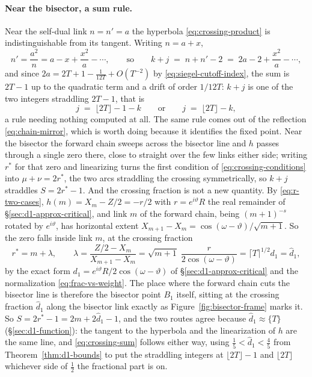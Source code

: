 \documentclass[11pt]{article}
\theoremstyle{definition}
\begin{document}
\paragraph{Near the bisector, a sum rule.} Near the self-dual link $n=n'=a$ the
hyperbola \eqref{eq:crossing-product} is indistinguishable from its tangent.
Writing $n=a+x$,
\begin{equation}\label{eq:crossing-tangent}
n'=\frac{a^{2}}{n}=a-x+\frac{x^{2}}{a}-\cdots ,
\qquad\text{so}\qquad
k+j\;=\;n+n'-2\;=\;2a-2+\frac{x^{2}}{a}-\cdots ,
\end{equation}
and since $2a=2T+1-\tfrac1{12T}+O(T^{-2})$ by
\eqref{eq:siegel-cutoff-index}, the sum is $2T-1$ up to the quadratic term and
a drift of order $1/12T$: $k+j$ is one of the two integers straddling $2T-1$,
that is
\begin{equation}\label{eq:crossing-sum}
j\;=\;\lfloor2T\rfloor-1-k
\qquad\text{or}\qquad
j\;=\;\lfloor2T\rfloor-k ,
\end{equation}
a rule needing nothing computed at all. The same rule comes out of the reflection
\eqref{eq:chain-mirror}, which is worth doing because it identifies the fixed
point. Near the bisector the
forward chain sweeps across the bisector line and $h$ passes through a single
zero there, close to straight over the few links either side; writing $r^{*}$
for that zero and linearizing turns the first condition of
\eqref{eq:crossing-conditions} into $\mu+\nu=2r^{*}$, the two arcs straddling
the crossing symmetrically, so $k+j$ straddles $S=2r^{*}-1$. And the crossing
fraction is not a new quantity.
By \eqref{eq:r-two-cases}, $h(m)=X_m-Z/2=-r/2$ with $r=e^{i\vartheta}R$ the real
remainder of \S\ref{sec:d1-approx-critical}, and link $m$ of the forward chain,
being $(m+1)^{-s}$ rotated by $e^{i\vartheta}$, has horizontal extent
$X_{m+1}-X_m=\cos(\omega-\vartheta)/\sqrt{m+1}$. So the zero falls inside link
$m$, at the crossing fraction
\begin{equation}\label{eq:crossing-rstar}
r^{*}=m+\lambda,
\qquad
\lambda=\frac{Z/2-X_m}{X_{m+1}-X_m}
=\sqrt{m+1}\;\frac{r}{2\cos(\omega-\vartheta)}
=\lceil T\rceil^{1/2}d_1=\hat d_1,
\end{equation}
by the exact form $d_1=e^{i\vartheta}R/2\cos(\omega-\vartheta)$ of
\S\ref{sec:d1-approx-critical} and the normalization
\eqref{eq:frac-vs-weight}. The place where the forward chain cuts the bisector
line is therefore the bisector point $B_1$ itself, sitting at the crossing
fraction $\hat d_1$ along the bisector link exactly as
Figure~\ref{fig:bisector-frame} marks it. So $S=2r^{*}-1=2m+2\hat d_1-1$, and
the two routes agree because $\hat d_1\approx\{T\}$ (\S\ref{sec:d1-function}):
the tangent to the hyperbola and the linearization of $h$ are the same line,
and \eqref{eq:crossing-sum} follows either way, using
$\tfrac15<\hat d_1<\tfrac45$ from Theorem~\ref{thm:d1-bounds} to put the
straddling integers at $\lfloor2T\rfloor-1$ and $\lfloor2T\rfloor$ whichever
side of $\tfrac12$ the fractional part is on.
\end{document}
